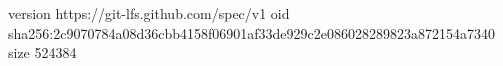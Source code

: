 version https://git-lfs.github.com/spec/v1
oid sha256:2c9070784a08d36cbb4158f06901af33de929c2e086028289823a872154a7340
size 524384
